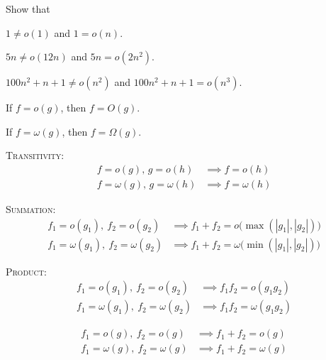 \begin{ex}
  Show that
  \begin{myenum}
  \item $1 \neq o(1)$ and $1 = o(n)$.
  \item $5n \neq o(12n)$ and $5n = o(2n^2)$.
  \item $100n^2 + n + 1 \neq o(n^2)$ and $100n^2 + n + 1 = o(n^3)$.
  \end{myenum}
\end{ex}


\begin{prop}
\mbox{}
\begin{myenum}
\item If $f = o(g)$, then $f = O(g)$. 
\item If $f = \omega(g)$, then $f = \Omega(g)$. 
\end{myenum}
\end{prop}



\begin{prop}
  \mbox{}
  \begin{myenum}
    \item
    \textsc{Transitivity:}
    \begin{align*}
      f = o(g) \text{, } g = o(h) &\implies f = o(h) \\
      f = \omega(g) \text{, } g = \omega(h) &\implies f = \omega(h)
    \end{align*}
  \item
    \textsc{Summation:}
    \begin{align*}
      f_1 = o(g_1), \ f_2 = o(g_2) &\implies f_1 + f_2 = o \bigl( \max(|g_1|,|g_2|) \bigr) \\
      f_1 = \omega(g_1), \ f_2 = \omega(g_2) &\implies f_1 + f_2 = \omega \bigl( \min(|g_1|,|g_2|) \bigr)
    \end{align*}
  \item
    \textsc{Product:}
    \begin{align*}
      f_1 = o(g_1), \ f_2 = o(g_2) &\implies f_1 f_2 = o(g_1 g_2) \\
      f_1 = \omega(g_1), \ f_2 = \omega(g_2) &\implies f_1 f_2 = \omega(g_1 g_2) 
    \end{align*}
  \end{myenum}
\end{prop}

\begin{cor}
    \begin{align*}
    f_1 = o(g), \ f_2 = o(g) &\implies f_1 + f_2 = o(g) \\
    f_1 = \omega(g), \ f_2 = \omega(g) &\implies f_1 + f_2 = \omega(g)
    \end{align*}
\end{cor}

